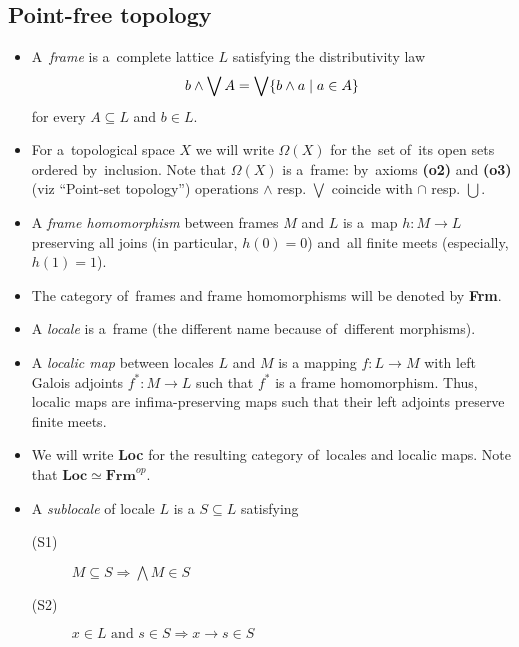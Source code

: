 \subsection*{Point-free topology}

\begin{itemize}
\item A~\emph{frame} is a~complete lattice $L$ satisfying the distributivity
law
\[
  b \wedge \bigvee A = \bigvee \{ b \wedge a \mid a\in A \}
\]
for every $A\subseteq L$ and $b\in L$.

\item For a~topological space $X$ we will write $\Omega(X)$ for the~set of~its
open sets ordered by~inclusion.
Note that $\Omega(X)$ is a~frame:
by~axioms {\bf (o2)} and {\bf (o3)} (viz ``Point-set topology'') operations
$\wedge$ resp. $\bigvee$ coincide with $\cap$ resp. $\bigcup$.

\item A \emph{frame homomorphism} between frames $M$ and $L$ is a~map $h\colon
M \to L$ preserving all joins (in particular, $h(0) = 0$) and~all finite meets
(especially, $h(1) = 1$).

\item The category of~frames and frame homomorphisms will be denoted by {\bf
Frm}.

\item A \emph{locale} is a~frame (the different name because of~different
morphisms).

\item A \emph{localic map} between locales $L$ and $M$ is a mapping $f\colon L
\to M$ with left Galois adjoints $f^*\colon M \to L$ such that $f^*$ is a frame
homomorphism.
Thus, localic maps are infima-preserving maps such that their left adjoints
preserve finite meets.

\item We will write {\bf Loc} for the resulting category of~locales and localic
maps.
Note that $\mathbf{Loc} \simeq \mathbf{Frm}^{op}$.

\item A \emph{sublocale} of locale $L$ is a $S\subseteq L$ satisfying
  \begin{description}
  \item[(S1)] $M\subseteq S \Longrightarrow \bigwedge M\in S$
  \item[(S2)] $x\in L \text{ and } s\in S \Longrightarrow x \rightarrow s \in S$ 
  \end{description}
\end{itemize}

